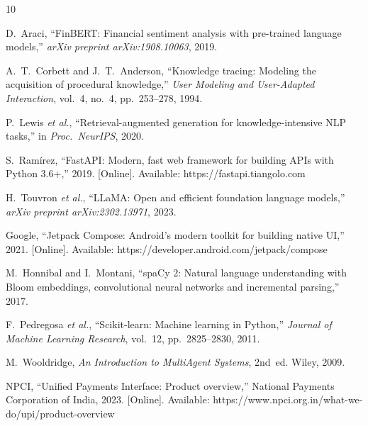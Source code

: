 \documentclass[conference]{IEEEtran}
\begin{document}
\begin{thebibliography}{10}

D.~Araci, ``FinBERT: Financial sentiment analysis with pre-trained language models,'' \textit{arXiv preprint arXiv:1908.10063}, 2019.

A.~T.~Corbett and J.~T.~Anderson, ``Knowledge tracing: Modeling the acquisition of procedural knowledge,'' \textit{User Modeling and User-Adapted Interaction}, vol.~4, no.~4, pp.~253--278, 1994.

P.~Lewis \textit{et al.}, ``Retrieval-augmented generation for knowledge-intensive NLP tasks,'' in \textit{Proc.\ NeurIPS}, 2020.

S.~Ram\'{i}rez, ``FastAPI: Modern, fast web framework for building APIs with Python 3.6+,'' 2019. [Online]. Available: https://fastapi.tiangolo.com

H.~Touvron \textit{et al.}, ``LLaMA: Open and efficient foundation language models,'' \textit{arXiv preprint arXiv:2302.13971}, 2023.

Google, ``Jetpack Compose: Android's modern toolkit for building native UI,'' 2021. [Online]. Available: https://developer.android.com/jetpack/compose

M.~Honnibal and I.~Montani, ``spaCy 2: Natural language understanding with Bloom embeddings, convolutional neural networks and incremental parsing,'' 2017.

F.~Pedregosa \textit{et al.}, ``Scikit-learn: Machine learning in Python,'' \textit{Journal of Machine Learning Research}, vol.~12, pp.~2825--2830, 2011.

M.~Wooldridge, \textit{An Introduction to MultiAgent Systems}, 2nd~ed.\hspace{0.6em} Wiley, 2009.

NPCI, ``Unified Payments Interface: Product overview,'' National Payments Corporation of India, 2023. [Online]. Available: https://www.npci.org.in/what-we-do/upi/product-overview

\end{thebibliography}
\end{document}
